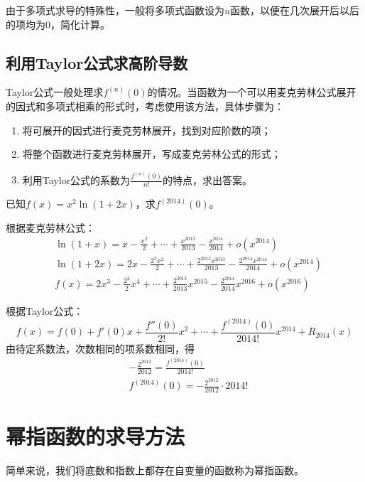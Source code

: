 由于多项式求导的特殊性，一般将多项式函数设为$u$函数，以便在几次展开后以后的项均为0，简化计算。

\subsection{利用Taylor公式求高阶导数}\label{sec:2.9.4}

Taylor公式一般处理求$f^{(n)}(0)$的情况。当函数为一个可以用麦克劳林公式展开的因式和多项式相乘的形式时，考虑使用该方法，具体步骤为：

\begin{enumerate}
	\item 将可展开的因式进行麦克劳林展开，找到对应阶数的项；
	\item 将整个函数进行麦克劳林展开，写成麦克劳林公式的形式；
	\item 利用Taylor公式的系数为$\frac{f^{(n)}(0)}{n!}$的特点，求出答案。
\end{enumerate}

\begin{example}
	已知$f(x)=x^2\ln{(1+2x)}$，求$f^{(2014)}(0)$。
	
	根据麦克劳林公式：
	\begin{align*}
		&\ln{(1+x)}=x-\frac{x^2}{2}+\cdots +\frac{x^{2013}}{2013}-\frac{x^{2014}}{2014}+o(x^{2014}) \\
		&\ln{(1+2x)}=2x-\frac{2^2 x^2}{2}+\cdots +\frac{2^{2013} x^{2013}}{2013}-\frac{2^{2014} x^{2014}}{2014}+o(x^{2014}) \\
		&f(x)=2x^3-\frac{2^2}{2}x^4+\cdots +\frac{2^{2013}}{2013}x^{2015}-\frac{2^{2014}}{2014}x^{2016}+o(x^{2016})
	\end{align*}
	
	根据Taylor公式：
	\[f(x)=f(0)+f'(0)x+\frac{f''(0)}{2!}x^2+\cdots+\frac{f^{(2014)}(0)}{2014!}x^{2014}+R_{2014}(x)\]
	由待定系数法，次数相同的项系数相同，得
	\begin{align*}
		&-\frac{2^{2012}}{2012}=\frac{f^{(2014)}(0)}{2014!} \\
		&f^{(2014)}(0)=-\frac{2^{2012}}{2012}\cdot 2014!
	\end{align*}
\end{example}

\section{幂指函数的求导方法}\label{sec:2.10}
简单来说，我们将底数和指数上都存在自变量的函数称为幂指函数。

